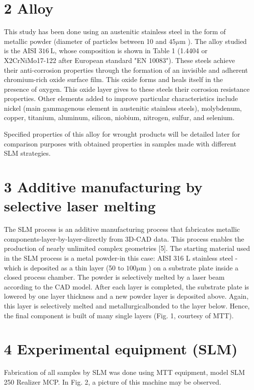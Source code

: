 \documentclass[10pt]{article}
\begin{document}
\section*{2 Alloy}
This study has been done using an austenitic stainless steel in the form of metallic powder (diameter of particles between 10 and $45 \mu \mathrm{m}$ ). The alloy studied is the AISI $316 \mathrm{~L}$, whose composition is shown in Table 1 (1.4404 or X2CrNiMo17-122 after European standard "EN 10083"). These steels achieve their anti-corrosion properties through the formation of an invisible and adherent chromium-rich oxide surface film. This oxide forms and heals itself in the presence of oxygen. This oxide layer gives to these steels their corrosion resistance properties. Other elements added to improve particular characteristics include nickel (main gammagenous element in austenitic stainless steels), molybdenum, copper, titanium, aluminum, silicon, niobium, nitrogen, sulfur, and selenium.

Specified properties of this alloy for wrought products will be detailed later for comparison purposes with obtained properties in samples made with different SLM strategies.

\section*{3 Additive manufacturing by selective laser melting}
The SLM process is an additive manufacturing process that fabricates metallic components-layer-by-layer-directly from 3D-CAD data. This process enables the production of nearly unlimited complex geometries [5]. The starting material used in the SLM process is a metal powder-in this case: AISI 316 L stainless steel - which is deposited as a thin layer (50 to $100 \mu \mathrm{m}$ ) on a substrate plate inside a closed process chamber. The powder is selectively melted by a laser beam according to the CAD model. After each layer is completed, the substrate plate is lowered by one layer thickness and a new powder layer is deposited above. Again, this layer is selectively melted and metallurgicalbonded to the layer below. Hence, the final component is built of many single layers (Fig. 1, courtesy of MTT).

\section*{4 Experimental equipment (SLM)}
Fabrication of all samples by SLM was done using MTT equipment, model SLM 250 Realizer MCP. In Fig. 2, a picture of this machine may be observed.
\end{document}
